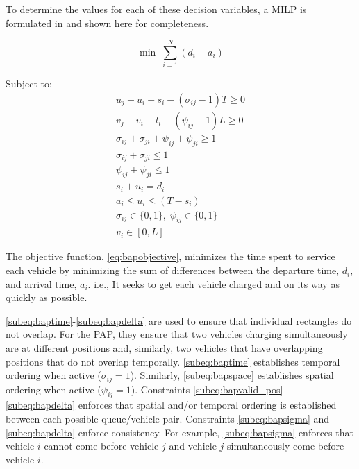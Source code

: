 \documentclass[utf8]{FrontiersinHarvard}
\let\cite\citep                                       %
\begin{document}
To determine the values for each of these decision variables, a MILP is formulated in \cite{qarebagh-2019-optim-sched}
and shown here for completeness.

\begin{equation}
	\label{eq:bapobjective}
	\min\; \sum_{i=1}^N (d_i - a_i)
\end{equation}

Subject to:
\begin{subequations}
\label{eq:bapconstrs}
\begin{align}
    u_j - u_i - s_i - (\sigma_{ij} - 1)T \geq 0                  \label{subeq:baptime}          \\
    v_j - v_i - l_i - (\psi_{ij} - 1)L \geq 0                \label{subeq:bapspace}           \\
    \sigma_{ij} + \sigma_{ji} + \psi_{ij} + \psi_{ji} \geq 1 \label{subeq:bapvalid_pos}     \\
    \sigma_{ij} + \sigma_{ji} \leq 1                              \label{subeq:bapsigma}        \\
    \psi_{ij} + \psi_{ji} \leq 1                              \label{subeq:bapdelta}        \\
    s_i + u_i = d_i                                               \label{subeq:bapdetach}       \\
    a_i \leq u_i \leq (T - s_i)                                   \label{subeq:bapvalid_starts} \\
    \sigma_{ij} \in \{0,1\},\;\psi_{ij} \in \{0,1\}\;           \label{subeq:bapsdspace}      \\
    v_i \in [0, L ]                                               \label{subeq:bapvspace}
\end{align}
\end{subequations}

\noindent

The objective function, \autoref{eq:bapobjective}, minimizes the time spent to service each vehicle by minimizing the
sum of differences between the departure time, \(d_i\), and arrival time, \(a_i\). i.e., It seeks to get each vehicle
charged and on its way as quickly as possible.

\autoref{subeq:baptime}-\autoref{subeq:bapdelta} are used to ensure that individual rectangles do not overlap. For the
PAP, they ensure that two vehicles charging simultaneously are at different positions and, similarly, two vehicles that
have overlapping positions that do not overlap temporally. \autoref{subeq:baptime} establishes temporal ordering when
active (\(\sigma_{ij}=1\)). Similarly, \autoref{subeq:bapspace} establishes spatial ordering when active (\(\psi_{ij} =1\)).
Constraints \autoref{subeq:bapvalid_pos}-\autoref{subeq:bapdelta} enforces that spatial and/or temporal ordering is
established between each possible queue/vehicle pair. Constraints \autoref{subeq:bapsigma} and \autoref{subeq:bapdelta}
enforce consistency. For example, \autoref{subeq:bapsigma} enforces that vehicle \(i\) cannot come before vehicle \(j\) and
vehicle \(j\) simultaneously come before vehicle \(i\).
\end{document}
